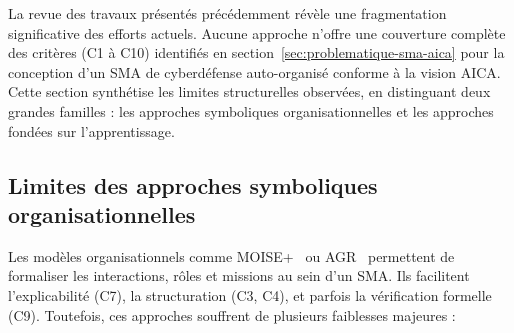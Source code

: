 \documentclass[ twoside,openright,titlepage,numbers=noenddot,headinclude,%
                footinclude=true,cleardoublepage=empty,abstractoff, %
                BCOR=5mm,paper=a4,fontsize=11pt,%
                french,american,%
                ]{scrreprt}
\begin{document}

La revue des travaux présentés précédemment révèle une fragmentation significative des efforts actuels. Aucune approche n'offre une couverture complète des critères (C1 à C10) identifiés en section~\ref{sec:problematique-sma-aica} pour la conception d'un SMA de cyberdéfense auto-organisé conforme à la vision AICA. Cette section synthétise les limites structurelles observées, en distinguant deux grandes familles : les approches symboliques organisationnelles et les approches fondées sur l'apprentissage.

\subsection{Limites des approches symboliques organisationnelles}

Les modèles organisationnels comme MOISE+~\cite{Hübner2002} ou AGR~\cite{Ferber2003} permettent de formaliser les interactions, rôles et missions au sein d'un SMA. Ils facilitent l'explicabilité (C7), la structuration (C3, C4), et parfois la vérification formelle (C9). Toutefois, ces approches souffrent de plusieurs faiblesses majeures :
\end{document}
